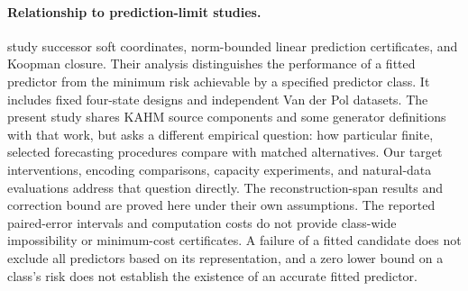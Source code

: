 \paragraph{Relationship to prediction-limit studies.}
\citet{KumarKargaran2026Limits} study successor soft coordinates,
norm-bounded linear prediction certificates, and Koopman closure. Their
analysis distinguishes the performance of a fitted predictor from the
minimum risk achievable by a specified predictor class. It includes
fixed four-state designs and independent Van der Pol datasets. The
present study shares KAHM source components and some generator definitions
with that work, but asks a different empirical question: how particular
finite, selected forecasting procedures compare with matched alternatives.
Our target interventions, encoding comparisons, capacity experiments,
and natural-data evaluations address that question directly. The
reconstruction-span results and correction bound are proved here under
their own assumptions. The reported paired-error intervals and computation
costs do not provide class-wide impossibility or minimum-cost certificates.
A failure of a fitted candidate does not exclude all predictors based on
its representation, and a zero lower bound on a class's risk does not
establish the existence of an accurate fitted predictor.
